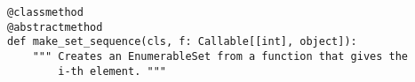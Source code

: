 \begin{verbatim}
@classmethod
@abstractmethod
def make_set_sequence(cls, f: Callable[[int], object]):
    """ Creates an EnumerableSet from a function that gives the
        i-th element. """
\end{verbatim}